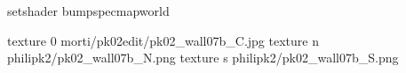 setshader bumpspecmapworld

texture 0 morti/pk02edit/pk02_wall07b_C.jpg
texture n philipk2/pk02_wall07b_N.png
texture s philipk2/pk02_wall07b_S.png

